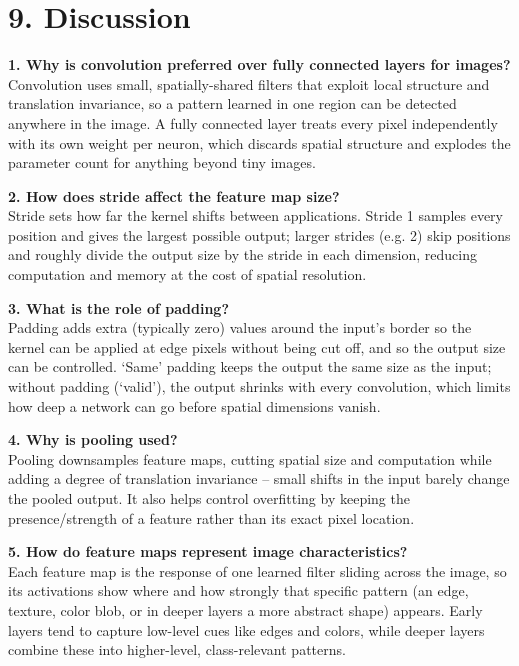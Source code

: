 \documentclass[11pt]{article}
\begin{document}
\section*{9. Discussion}

\textbf{1. Why is convolution preferred over fully connected layers for images?}\\
Convolution uses small, spatially-shared filters that exploit local structure and translation invariance, so a pattern learned in one region can be detected anywhere in the image. A fully connected layer treats every pixel independently with its own weight per neuron, which discards spatial structure and explodes the parameter count for anything beyond tiny images.

\textbf{2. How does stride affect the feature map size?}\\
Stride sets how far the kernel shifts between applications. Stride 1 samples every position and gives the largest possible output; larger strides (e.g. 2) skip positions and roughly divide the output size by the stride in each dimension, reducing computation and memory at the cost of spatial resolution.

\textbf{3. What is the role of padding?}\\
Padding adds extra (typically zero) values around the input's border so the kernel can be applied at edge pixels without being cut off, and so the output size can be controlled. `Same' padding keeps the output the same size as the input; without padding (`valid'), the output shrinks with every convolution, which limits how deep a network can go before spatial dimensions vanish.

\textbf{4. Why is pooling used?}\\
Pooling downsamples feature maps, cutting spatial size and computation while adding a degree of translation invariance -- small shifts in the input barely change the pooled output. It also helps control overfitting by keeping the presence/strength of a feature rather than its exact pixel location.

\textbf{5. How do feature maps represent image characteristics?}\\
Each feature map is the response of one learned filter sliding across the image, so its activations show where and how strongly that specific pattern (an edge, texture, color blob, or in deeper layers a more abstract shape) appears. Early layers tend to capture low-level cues like edges and colors, while deeper layers combine these into higher-level, class-relevant patterns.
\end{document}

